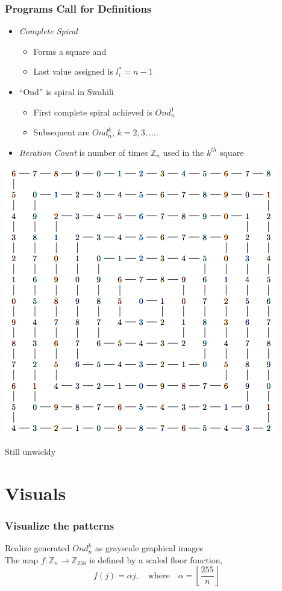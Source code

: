 \documentclass{beamer}
\theoremstyle{mydef}
\begin{document}
\frame
{
\frametitle{Programs Call for Definitions}
\begin{itemize} 
\item \emph{Complete Spiral}
\begin{itemize}
\item Forms a square and
\item Last value assigned is $l^*_i = n-1$
\end{itemize}

\item ``Ond'' is spiral in Swahili
\begin{itemize}
\item First complete spiral achieved is  $Ond^1_n$
\item Subsequent are $Ond^k_n$, $k = 2,3,\dots$.  
\end{itemize}
\item \emph{Iteration Count} is number of times $\mathbb{Z}_n$ used in the $k^{th}$ square
\end{itemize}
}

\frame
{
\begin{center}
\includegraphics[scale=.5]{images/tikz.png}

Still unwieldy

\end{center}
}

\section{Visuals}
\frame
{
  \frametitle{Visualize the patterns}
  Realize generated $Ond_n^k$ as grayscale graphical images\\
  \vspace{10 mm}
  The map $f : \mathbb{Z}_n \to \mathbb{Z}_{256}$ is defined by a scaled floor function,
\[
   f(j) = \alpha j, \quad \text{where} \quad
   \alpha = \left\lfloor \frac{255}n \right\rfloor
\]
}
\end{document}
